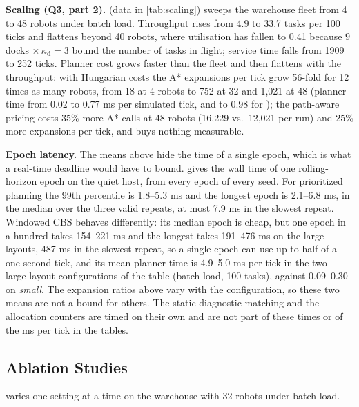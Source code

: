 \noindent\textbf{Scaling (Q3, part 2).}
 (data in \cref{tab:scaling}) sweeps the warehouse fleet
from 4 to 48 robots under batch load. Throughput rises from 4.9 to 33.7 tasks
per 100 ticks and flattens beyond 40 robots, where utilisation has fallen to
0.41 because $9$ docks $\times\,\kappa_{\mathrm{d}}=3$ bound the number of
tasks in flight; service time falls from 1909 to 252 ticks. Planner cost
grows faster than the fleet and then flattens with the throughput: with
Hungarian costs the A* expansions per tick grow 56-fold for 12 times as many
robots, from 18 at 4 robots to 752 at 32 and 1{,}021 at 48 (planner time from
0.02 to 0.77 ms per simulated tick, and to 0.98 for \sname); the path-aware
pricing costs 35\% more A* calls at
48 robots (16{,}229 vs.\ 12{,}021 per run) and 25\% more expansions per
tick, and buys nothing measurable.



\noindent\textbf{Epoch latency.}
The means above hide the time of a single epoch, which is what a real-time
deadline would have to bound.  gives the wall time of one
rolling-horizon epoch on the quiet host, from every epoch of every seed. For
prioritized planning the 99th percentile is 1.8--5.3 ms and the longest epoch is
2.1--6.8 ms, in the median over the three valid repeats, at most 7.9 ms in the
slowest repeat. Windowed CBS behaves differently: its median epoch is
cheap, but one epoch in a hundred takes 154--221 ms and the longest takes
191--476 ms on the large layouts, 487 ms in the slowest repeat, so a single epoch
can use up to half of a one-second tick, and its mean planner time is 4.9--5.0 ms per
tick in the two large-layout configurations of the table (batch load, 100 tasks), against 0.09--0.30 on \emph{small}.
The expansion ratios above vary with the configuration, so these two means are not a bound for others. The static
diagnostic matching and the allocation counters are timed on their own and are
not part of these times or of the ms per tick in the tables.

\subsection{Ablation Studies}\label{subsec:ablation}


 varies one setting at a time on the warehouse with 32
robots under batch load.

